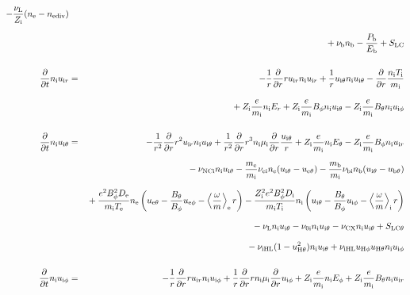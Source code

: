 \documentclass[11pt]{article}
\def\r#1{{\rm#1}}
\def\ddt{\frac{\partial}{\partial t}}
\def\ddr{\frac{\partial}{\partial r}}
\def\ave#1{\left\langle#1\right\rangle}
\def\me{m_\r{e}}
\def\mi{m_\r{i}}
\def\mb{m_\r{b}}
\def\mue{\mu_\r{e}}
\def\mui{\mu_\r{i}}
\def\De{D_\r{e}}
\def\Di{D_\r{i}}
\def\ne{n_\r{e}}
\def\ni{n_\r{i}}
\def\nb{n_\r{b}}
\def\uir{u_{\r{i}r}}
\def\ueth{u_{\r{e}\theta}}
\def\uith{u_{\r{i}\theta}}
\def\ubth{u_{\r{b}\theta}}
\def\ueph{u_{\r{e}\phi}}
\def\uiph{u_{\r{i}\phi}}
\def\Er{E_r}
\def\Eth{E_\theta}
\def\Eph{E_\phi}
\def\Bth{B_\theta}
\def\Bph{B_\phi}
\def\Te{T_\r{e}}
\def\Ti{T_\r{i}}
\def\Zi{Z_\r{i}}
\def\Pb{P_\r{b}}
\def\Eb{E_\r{b}}
\def\nuNCi{\nu_\r{NCi}}
\def\nuei{\nu_\r{ei}}
\def\nuni{\nu_\r{0i}}
\def\nuL{\nu_\r{L}}
\def\nuCX{\nu_\r{CX}}
\def\nub{\nu_\r{b}}
\def\nediv{n_\r{ediv}}
\newcommand{\Frac}[2]{%
  {\displaystyle {\displaystyle #1\over \displaystyle #2}}%
}
\newcommand{\rdprd}[2]{\Frac{\partial #1}{\partial #2}}
\newcommand{\aveaveB}[1]{\left< \!\! \left< #1 \right> \!\! \right>}
\begin{document}
\begin{eqnarray}
%
  - \frac{\nuL}{\Zi} (\ne - \nediv) 
\nonumber\\[2.5mm]&&{}
%
  + \nub \nb
%
  - \frac{\Pb}{\Eb}
%
  + S_\r{LC}
\\[5mm]
%
%
  \ddt \ni \uir &=&
%
  - \frac{1}{r} \ddr r \uir \ni \uir
%
  + \frac{1}{r} \uith \ni \uith
%
  - \ddr \frac{\ni \Ti}{\mi}
\nonumber\\[3mm]&&{}
%
  + \Zi \frac{e}{\mi}\ni \Er
%
  + \Zi \frac{e}{\mi} \Bph \ni \uith
%
  - \Zi \frac{e}{\mi} \Bth \ni \uiph
\\[5mm]
%
%
  \ddt \ni \uith &=&
%
  - \frac{1}{r^2} \ddr r^2 \uir \ni \uith
%
  + \frac{1}{r^2} \ddr r^3 \ni \mui \ddr \frac{\uith}{r}
%
  + \Zi \frac{e}{\mi} \ni \Eth
%
  - \Zi \frac{e}{\mi} \Bph \ni \uir
\nonumber\\[2.5mm]&&{}
%
  - \nuNCi \ni \uith
%
  - \frac{\me}{\mi} \nuei \ne (\uith - \ueth)
%
  - \frac{\mb}{\mi} \nu_\r{bi} \nb (\uith - \ubth)
\nonumber\\[2.5mm]&&{}
%
  + \frac{e^2 \Bph^2 \De}{\mi\Te}\ne
    \left(\ueth - \frac{\Bth}{\Bph}\ueph - \ave{\frac{\omega}{m}}_\r{e}
     r \right)
%
  - \frac{\Zi^2 e^2 \Bph^2 \Di}{\mi\Ti}\ni
    \left(\uith - \frac{\Bth}{\Bph}\uiph - \ave{\frac{\omega}{m}}_\r{i}
     r \right)
%
\nonumber\\[2.5mm]&&{}
%
  - \nuL \ni \uith
%
  - \nuni \ni \uith
%
  - \nuCX \ni \uith
%
  + S_\r{LC\theta}
\nonumber\\[2.5mm]&&{}
%
  - \nu_\r{iHL} (1 - u_{\r{H}\theta}^2) \ni \uith
%
  + \nu_\r{iHL} u_{\r{H}\phi} u_{\r{H}\theta} \ni \uiph
\\[5mm]
%
%
  \ddt \ni \uiph &=&
%
  - \frac{1}{r} \ddr r \uir \ni \uiph
%
  + \frac{1}{r} \ddr r \ni \mui \ddr \uiph
%
  + \Zi \frac{e}{\mi} \ni \Eph
%
  + \Zi \frac{e}{\mi} \Bth \ni \uir 
\nonumber\\[2.5mm]&&{}

\end{eqnarray}
\end{document}
